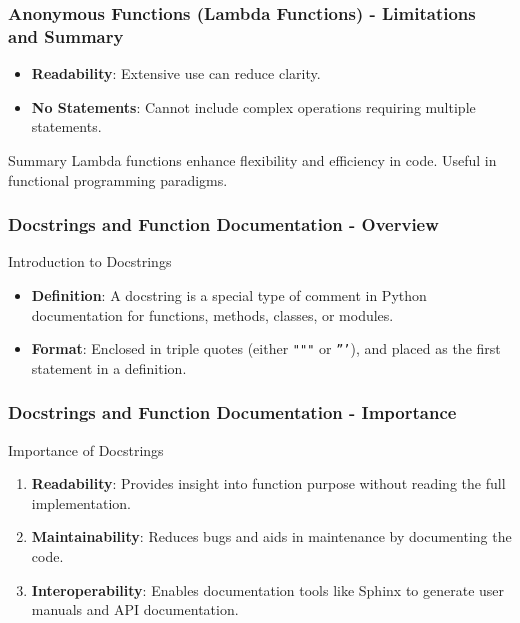 \documentclass{beamer}
\begin{document}
\begin{frame}
    \frametitle{Anonymous Functions (Lambda Functions) - Limitations and Summary}
    \begin{itemize}
        \item \textbf{Readability}: Extensive use can reduce clarity.
        \item \textbf{No Statements}: Cannot include complex operations requiring multiple statements.
    \end{itemize}
    \begin{block}{Summary}
        Lambda functions enhance flexibility and efficiency in code.
        Useful in functional programming paradigms.
    \end{block}
\end{frame}

\begin{frame}[fragile]
    \frametitle{Docstrings and Function Documentation - Overview}
    \begin{block}{Introduction to Docstrings}
        \begin{itemize}
            \item \textbf{Definition}: A docstring is a special type of comment in Python documentation for functions, methods, classes, or modules.
            \item \textbf{Format}: Enclosed in triple quotes (either \texttt{"""} or \texttt{'''}), and placed as the first statement in a definition.
        \end{itemize}
    \end{block}
\end{frame}

\begin{frame}[fragile]
    \frametitle{Docstrings and Function Documentation - Importance}
    \begin{block}{Importance of Docstrings}
        \begin{enumerate}
            \item \textbf{Readability}: Provides insight into function purpose without reading the full implementation.
            \item \textbf{Maintainability}: Reduces bugs and aids in maintenance by documenting the code.
            \item \textbf{Interoperability}: Enables documentation tools like Sphinx to generate user manuals and API documentation.
        \end{enumerate}
    \end{block}
\end{frame}
\end{document}
